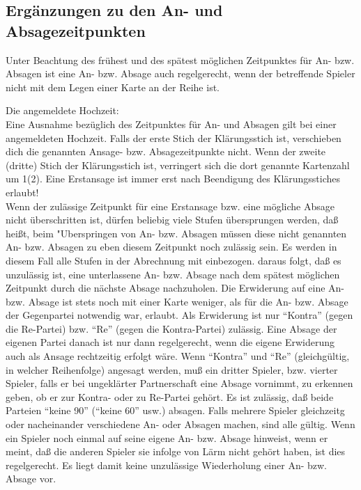 \documentclass[12pt]{scrartcl}
\begin{document}
\subsection{Ergänzungen zu den An- und Absagezeitpunkten}
Unter Beachtung des frühest und des spätest möglichen
Zeitpunktes für An- bzw. Absagen ist eine An- bzw. Absage auch
regelgerecht, wenn der betreffende Spieler nicht mit dem Legen
einer Karte an der Reihe ist.

Die angemeldete Hochzeit:\\
Eine Ausnahme bezüglich des Zeitpunktes für An- und Absagen
gilt bei einer angemeldeten Hochzeit. Falls der erste Stich der
Klärungsstich ist, verschieben dich die genannten Ansage- bzw.
Absagezeitpunkte nicht. Wenn der zweite (dritte) Stich der
Klärungsstich ist, verringert sich die dort genannte Kartenzahl
um 1(2). Eine Erstansage ist immer erst nach Beendigung des
Klärungsstiches erlaubt!
\\
Wenn der zulässige Zeitpunkt für eine Erstansage bzw. eine
mögliche Absage nicht überschritten ist, dürfen beliebig viele
Stufen übersprungen werden, daß heißt, beim "Uberspringen von
An- bzw. Absagen müssen diese nicht genannten An- bzw. Absagen
zu eben diesem Zeitpunkt noch zulässig sein. Es werden in diesem
Fall alle Stufen in der Abrechnung mit einbezogen. daraus folgt,
daß es unzulässig ist, eine unterlassene An- bzw. Absage nach
dem spätest möglichen Zeitpunkt durch die nächste Absage
nachzuholen. Die Erwiderung auf eine An- bzw. Absage ist stets
noch mit einer Karte weniger, als für die An- bzw. Absage der
Gegenpartei notwendig war, erlaubt. Als Erwiderung ist nur
"`Kontra"' (gegen die Re-Partei) bzw. "`Re"' (gegen die
Kontra-Partei) zulässig. Eine Absage der eigenen Partei danach
ist nur dann regelgerecht, wenn die eigene Erwiderung auch als
Ansage rechtzeitig erfolgt wäre. Wenn "`Kontra"' und "`Re"'
(gleichgültig, in welcher Reihenfolge) angesagt werden, muß ein
dritter Spieler, bzw. vierter Spieler, falls er bei ungeklärter
Partnerschaft eine Absage vornimmt, zu erkennen geben, ob er zur
Kontra- oder zu Re-Partei gehört. Es ist zulässig, daß beide
Parteien "`keine 90"' ("`keine 60"' usw.) absagen. Falls mehrere
Spieler gleichzeitg oder nacheinander verschiedene An- oder
Absagen machen, sind alle gültig. Wenn ein Spieler noch einmal
auf seine eigene An- bzw. Absage hinweist, wenn er meint, daß
die anderen Spieler sie infolge von Lärm nicht gehört haben,
ist dies regelgerecht. Es liegt damit keine unzulässige
Wiederholung einer An- bzw. Absage vor.
\end{document}
